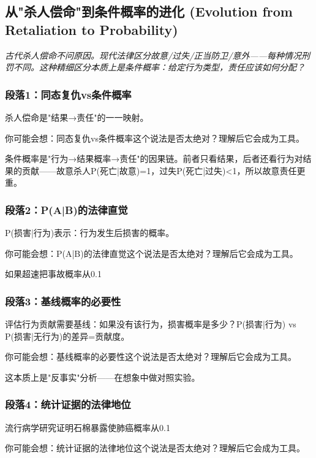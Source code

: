 \documentclass[a4paper,12pt]{book}
\newenvironment{motivation}{\begin{tcolorbox}[colback=gray!10,colframe=gray!60,title=\textit{动机}]\small\itshape}{\end{tcolorbox}}
\begin{document}
	\subsection{从"杀人偿命"到条件概率的进化 (Evolution from Retaliation to Probability)}
	\begin{motivation}
		古代杀人偿命不问原因。现代法律区分故意/过失/正当防卫/意外——每种情况刑罚不同。这种精细区分本质上是条件概率：给定行为类型，责任应该如何分配？
	\end{motivation}

	\subsubsection*{段落1：同态复仇vs条件概率}
	杀人偿命是"结果→责任"的一一映射。
	\begin{tcolorbox}[colback=yellow!5, title=\textit{读者行为预测}]
		你可能会想：同态复仇vs条件概率这个说法是否太绝对？理解后它会成为工具。
	\end{tcolorbox}

条件概率是"行为→结果概率→责任"的因果链。前者只看结果，后者还看行为对结果的贡献——故意杀人P(死亡|故意)=1，过失P(死亡|过失)<1，所以故意责任更重。

	\subsubsection*{段落2：P(A|B)的法律直觉}
	P(损害|行为)表示：行为发生后损害的概率。
	\begin{tcolorbox}[colback=yellow!5, title=\textit{读者行为预测}]
		你可能会想：P(A|B)的法律直觉这个说法是否太绝对？理解后它会成为工具。
	\end{tcolorbox}

如果超速把事故概率从0.1%

	\subsubsection*{段落3：基线概率的必要性}
	评估行为贡献需要基线：如果没有该行为，损害概率是多少？P(损害|行为) vs P(损害|无行为)的差异=贡献度。
	\begin{tcolorbox}[colback=yellow!5, title=\textit{读者行为预测}]
		你可能会想：基线概率的必要性这个说法是否太绝对？理解后它会成为工具。
	\end{tcolorbox}

这本质上是"反事实"分析——在想象中做对照实验。

	\subsubsection*{段落4：统计证据的法律地位}
	流行病学研究证明石棉暴露使肺癌概率从0.1%
	\begin{tcolorbox}[colback=yellow!5, title=\textit{读者行为预测}]
		你可能会想：统计证据的法律地位这个说法是否太绝对？理解后它会成为工具。
	\end{tcolorbox}
\end{document}
